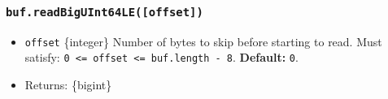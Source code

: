 \begin{Shaded}
\begin{Highlighting}[]
\NormalTok{ \{ }\NormalTok{ \} } \OperatorTok{;}

\OperatorTok{=} \NormalTok{([}\OperatorTok{,} \OperatorTok{,} \OperatorTok{,} \OperatorTok{,} \OperatorTok{,} \OperatorTok{,} \OperatorTok{,} \NormalTok{])}\OperatorTok{;}

\NormalTok{(}\NormalTok{))}\OperatorTok{;}
\end{Highlighting}
\end{Shaded}

\begin{Shaded}
\begin{Highlighting}[]
\NormalTok{ \{ }\NormalTok{ \} }\OperatorTok{=} \NormalTok{(}\NormalTok{)}\OperatorTok{;}

\OperatorTok{=} \NormalTok{([}\OperatorTok{,} \OperatorTok{,} \OperatorTok{,} \OperatorTok{,} \OperatorTok{,} \OperatorTok{,} \OperatorTok{,} \NormalTok{])}\OperatorTok{;}

\NormalTok{(}\NormalTok{))}\OperatorTok{;}
\end{Highlighting}
\end{Shaded}

\subsubsection{\texorpdfstring{\texttt{buf.readBigUInt64LE({[}offset{]})}}{buf.readBigUInt64LE({[}offset{]})}}\label{buf.readbiguint64leoffset}

\begin{itemize}
\tightlist
\item
  \texttt{offset} \{integer\} Number of bytes to skip before starting to
  read. Must satisfy:
  \texttt{0\ \textless{}=\ offset\ \textless{}=\ buf.length\ -\ 8}.
  \textbf{Default:} \texttt{0}.
\item
  Returns: \{bigint\}
\end{itemize}

